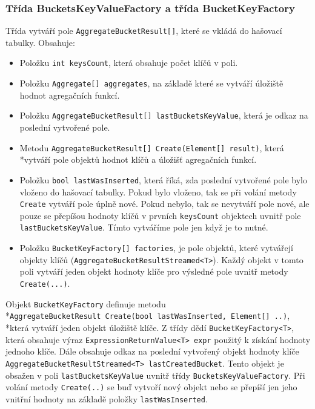 \subsubsection{Třída BucketsKeyValueFactory a třída BucketKeyFactory}

Třída vytváří pole \texttt{AggregateBucketResult[]}, které se vkládá do hašovací tabulky.
Obsahuje:
\begin{itemize}
\item Položku \texttt{int keysCount}, která obsahuje počet klíčů v poli.
\item Položku \texttt{Aggregate[] aggregates}, na základě které se vytváří úložiště hodnot agregačních funkcí.
\item Položku \texttt{AggregateBucketResult[] lastBucketsKeyValue}, která je odkaz na poslední vytvořené pole.
\item Metodu \texttt{AggregateBucketResult[] Create(Element[] result)}, která \\*vytváří pole objektů hodnot klíčů a úložišť agregačních funkcí.
\item Položku \texttt{bool lastWasInserted}, která říká, zda poslední vytvořené pole bylo vloženo do hašovací tabulky.
Pokud bylo vloženo, tak se při volání metody \texttt{Create} vytváří pole úplně nové.
Pokud nebylo, tak se nevytváří pole nové, ale pouze se přepíšou hodnoty klíčů v prvních \texttt{keysCount} objektech uvnitř pole \texttt{lastBucketsKeyValue}.
Tímto vytváříme pole jen když je to nutné.
\item Položku \texttt{BucketKeyFactory[] factories}, je pole objektů, které vytvářejí objekty klíčů (\texttt{AggregateBucketResultStreamed<T>}).
Každý objekt v tomto poli vytváří jeden objekt hodnoty klíče pro výsledné pole uvnitř metody \texttt{Create(...)}.
\end{itemize}
Objekt \texttt{BucketKeyFactory} definuje metodu \\*\texttt{AggregateBucketResult Create(bool lastWasInserted, Element[] ..)}, \\*která vytváří jeden objekt úložiště klíče.
Z třídy dědí \texttt{BucketKeyFactory<T>}, která obsahuje výraz \texttt{ExpressionReturnValue<T> expr} použitý k získání hodnoty jednoho klíče.
Dále obsahuje odkaz na poslední vytvořený objekt hodnoty klíče \texttt{AggregateBucketResultStreamed<T> lastCreatedBucket}.
Tento objekt je obsažen v poli \texttt{lastBucketsKeyValue} uvnitř třídy \texttt{BucketsKeyValueFactory}.
Při volání metody \texttt{Create(..)} se buď vytvoří nový objekt nebo se přepíší jen jeho vnitřní hodnoty na základě položky \texttt{lastWasInserted}.

